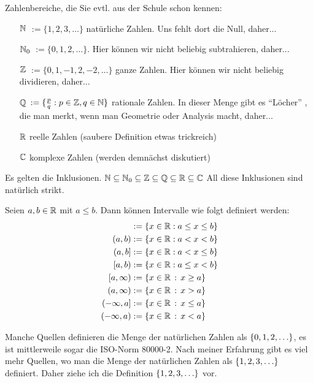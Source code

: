 \begin{bem}
	Zahlenbereiche, die Sie evtl. aus der Schule schon kennen:
\begin{itemize}
\item[$ \mathbb{N} $] $ := \{ 1,2,3,\ldots \} $ natürliche Zahlen. Uns fehlt dort die Null, daher... 
\item[$ \mathbb{N}_0 $] $ := \{ 0,1,2,\ldots \} $. Hier können wir nicht beliebig subtrahieren, daher... 
\item[$ \mathbb{Z} $] $ := \{ 0,1,-1,2,-2,\ldots \} $ ganze Zahlen. Hier können wir nicht beliebig dividieren, daher...
\item[$ \mathbb{Q} $] $ := \{ \frac{p}{q} : p \in \mathbb{Z}, q \in \mathbb{N} \} $ rationale Zahlen. In dieser Menge gibt es ``Löcher'' , die man merkt, wenn man Geometrie oder Analysis macht, daher...
\item[$ \mathbb{R} $] reelle Zahlen (saubere Definition etwas trickreich)
\item[$ \mathbb{C} $] komplexe Zahlen (werden demnächst diskutiert) 
\end{itemize}
\end{bem}

\begin{bem}
	Es gelten die Inklusionen. 
 $ \mathbb{N} \subseteq \mathbb{N}_0 \subseteq \mathbb{Z} \subseteq \mathbb{Q} \subseteq \mathbb{R} \subseteq \mathbb{C} $
 All diese Inklusionen sind natürlich strikt. 
 \end{bem} 

\begin{bem}[Intervalle]
	Seien $ a,b \in \mathbb{R} $ mit $ a \leq b $. Dann können Intervalle wie folgt definiert werden:
	\begin{align*}
		[a,b] &:= \{ x \in \R : a \leq x \leq b \}\\
		(a,b) &:= \{ x \in \R : a < x < b \}\\
		(a,b] &:= \{ x \in \R : a < x \leq b \}\\
		[a,b) &:= \{ x \in \R : a \leq x < b \} \\
		[a,\infty) & := \setcond{x \in \R}{x \ge a} \\
		(a,\infty) &:= \setcond{x \in \R}{x > a} \\ 
		(-\infty,a] &:= \setcond{x \in \R}{x \le a} \\
		(-\infty,a) &:= \setcond{x \in \R}{x < a}
	\end{align*}
\end{bem}



\begin{bem}
Manche Quellen definieren die Menge der natürlichen Zahlen als $ \left\{ 0,1,2,\ldots \right\} $, es ist mittlerweile sogar die ISO-Norm 80000-2. Nach meiner Erfahrung gibt es viel mehr Quellen, wo man
	die Menge der natürlichen Zahlen als $ \left\{ 1,2,3,\ldots \right\} $ definiert. Daher
	ziehe ich die Definition $ \left\{ 1,2,3,\ldots \right\} $ vor.
\end{bem}

